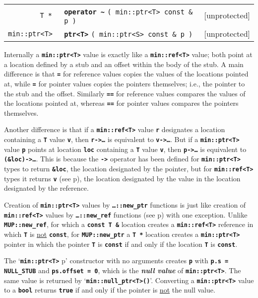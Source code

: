 \documentclass[12pt]{article}
\makeatletter
\newcommand{\TT}[1]{{\tt \bfseries #1}}
\newcommand{\mkey}[2]{{\bf \em #1}\index{#1!#2}}
\newcommand{\ttindex}[1]{\index{#1@{\tt #1}}}
\newcommand{\ttomkey}[3]{\TT{operator #2}\index{#1@{\tt operator #2}!{#3}}}
\newcommand{\pagref}[1]{p\pageref{#1}}
\newcommand{\EOL}{\penalty \exhyphenpenalty}
\newenvironment{indpar}[1][0.3in]%
	{\begin{list}{}%
		     {\setlength{\itemsep}{0in}%
		      \setlength{\topsep}{0in}%
		      \setlength{\parsep}{1ex}%
		      \setlength{\labelwidth}{#1}%
		      \setlength{\leftmargin}{#1}%
		      \addtolength{\leftmargin}{\labelsep}}%
	 \item}%
	{\end{list}}
\newcommand{\LABEL}[1]{\label{#1}}
\newcommand{\TTOMKEY}[3]{\ttomkey{#1}{#2}{#3}}
\newcommand{\MINKEY}[1]%
	   {\TT{#1}\ttindex{min::#1}\ttindex{#1}}
\makeatother
\begin{document}
\begin{indpar}\begin{tabular}{r@{}ll}
\verb|T * |
	& \TTOMKEY{\textasciitilde}{\textasciitilde}{of {\tt min::ptr<T>}}
	  \verb|( min::ptr<T> const & p )| & [unprotected]
\LABEL{MIN::TILDE_OF_PTR} \\
\verb|min::ptr<T> |
	& \MINKEY{ptr<T>}
	   \verb|( min::ptr<S> const & p )| & [unprotected]
\LABEL{MIN::PTR_OF_PTR} \\
\end{tabular}\end{indpar}

Internally a \TT{min::\EOL ptr<T>} value is exactly like a
\TT{min::\EOL ref<T>} value; both point at a location defined by
a stub and an offset within the body of the stub.
A main difference is that \TT{=} for reference values copies the
values of the locations pointed at, while \TT{=} for pointer values
copies the pointers themselves; i.e., the pointer to the stub and the offset.
Similarly \TT{==} for reference values compares the values of
the locations pointed at, whereas \TT{==} for pointer values
compares the pointers themselves.

Another difference is that if a \TT{min::\EOL ref<T>} value \TT{r}
designates a location containing a \TT{T} value \TT{v}, then
\TT{r->\ldots}\label{PTR->} is equivalent to \TT{v->\ldots}.
But if a \TT{min::\EOL ptr<T>} value \TT{p}
points at location \TT{loc} containing a \TT{T} value \TT{v}, then
\TT{p->\ldots} is equivalent to \TT{(\&loc)->\ldots}.
This is because
the \TT{->} operator has been defined for \TT{min::\EOL ptr<T>}
types to return \TT{\&loc}, the location designated by the pointer,
but for \TT{min::\EOL ref<T>} types
it returns \TT{v} (see \pagref{REF->}), the location designated by
the value in the location designated by the reference.

Creation of \TT{min::\EOL ptr<T>} values by \TT{\ldots::new\_\EOL ptr}
functions is just like
creation of \TT{min::\EOL ref<T>} values by \TT{\ldots::new\_\EOL ref}
functions (see \pagref{NEW_REF_USAGE}) with one exception.
Unlike \TT{MUP::\EOL new\_\EOL ref}, for which a \TT{const~T~\&}
location creates a \TT{min::\EOL ref<T>} reference in which \TT{T}
is \underline{not} \TT{const},
for \TT{MUP::\EOL new\_\EOL ptr}
a \TT{T~*} location creates a \TT{min::\EOL ptr<T>} pointer in which
the pointer \TT{T} is \TT{const} if and only if the location \TT{T}
is \TT{const}.

The `\TT{min::\EOL ptr<T>} p' constructor with no arguments creates \TT{p}
with \TT{p.s = NULL\_STUB} and \TT{ps.offset = 0}, which is the
\mkey{null value}{of {\tt ptr<T>}} of \TT{min::\EOL ptr<T>}.
The same value is returned by `\TT{min::\EOL null\_\EOL ptr<T>()}'.
Converting a \TT{min::\EOL ptr<T>} value to a \TT{bool} returns \TT{true}
if and only if the pointer is \underline{not} the null value.
\end{document}
